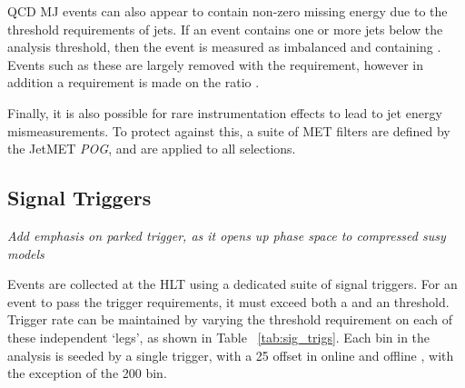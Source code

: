 QCD MJ events can also appear to contain non-zero missing energy 
due to the threshold requirements of jets. If an event contains 
one or more jets below the analysis threshold, then the 
event is measured as imbalanced and containing \mht. Events such as these are largely 
removed with the \alphat requirement, however in addition a requirement is made on the
ratio \mhtmet.

Finally, it is also possible for rare instrumentation effects to lead to jet 
energy
mismeasurements. To protect against this, a suite of MET filters are defined by 
the JetMET \emph{POG}, and are applied to all selections.


\subsection{Signal Triggers}

\emph{Add emphasis on parked trigger, as it opens up phase space to compressed susy models}

Events are collected at the HLT using a dedicated suite of
signal triggers. For an event to pass the trigger
requirements, it must exceed both a \HT and an \alphat threshold. Trigger rate 
can be maintained by varying the
threshold requirement on each of these independent `legs', as shown in Table~
\ref{tab:sig_trigs}. Each \HT bin in the analysis is seeded by a single trigger,
with a 25 \gev offset in online and offline \HT, with the exception of the
200 \gev bin.


